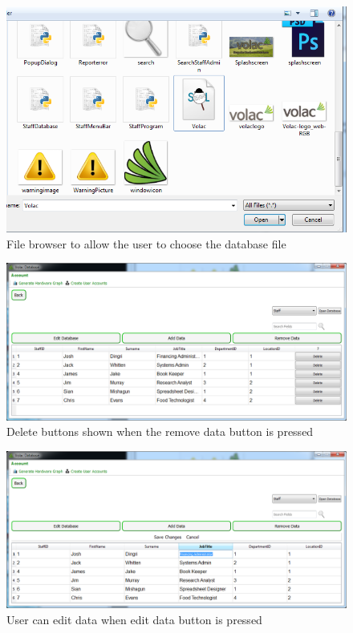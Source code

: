 \begin{figure}[H]
    \includegraphics[width=\textwidth]{./Maintenance/Images/filebrowser.png}
    \caption{File browser to allow the user to choose the database file} \label{fig:filebrowser}
\end{figure}

\begin{figure}[H]
    \includegraphics[width=\textwidth]{./Maintenance/Images/deletingdata.png}
    \caption{Delete buttons shown when the remove data button is pressed} \label{fig:deletingdata}
\end{figure}

\begin{figure}[H]
    \includegraphics[width=\textwidth]{./Maintenance/Images/EditingData.png}
    \caption{User can edit data when edit data button is pressed} \label{fig:EditingData}
\end{figure}

